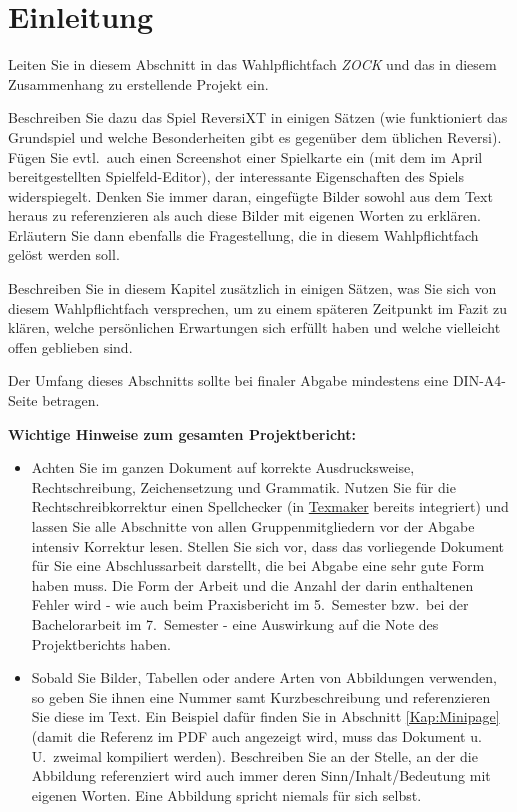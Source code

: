 \documentclass[12pt,a4paper,bibliography=totocnumbered,listof=totocnumbered]{article}
\begin{document}
\section{Einleitung}
Leiten Sie in diesem Abschnitt in das Wahlpflichtfach \emph{ZOCK} und das in diesem Zusammenhang zu erstellende Projekt ein.

Beschreiben Sie dazu das Spiel ReversiXT in einigen Sätzen (wie funktioniert das Grundspiel und welche Besonderheiten gibt es gegenüber dem üblichen Reversi). Fügen Sie evtl.\ auch einen Screenshot einer Spielkarte ein (mit dem im April bereitgestellten Spielfeld-Editor), der interessante Eigenschaften des Spiels widerspiegelt. Denken Sie immer daran, eingefügte Bilder sowohl aus dem Text heraus zu referenzieren als auch diese Bilder mit eigenen Worten zu erklären. Erläutern Sie dann ebenfalls die Fragestellung, die in diesem Wahlpflichtfach gelöst werden soll.

Beschreiben Sie in diesem Kapitel zusätzlich in einigen Sätzen, was Sie sich von diesem Wahlpflichtfach versprechen, um zu einem späteren Zeitpunkt im Fazit zu klären, welche persönlichen Erwartungen sich erfüllt haben und welche vielleicht offen geblieben sind.

Der Umfang dieses Abschnitts sollte bei finaler Abgabe mindestens eine DIN-A4-Seite betragen.

\bigskip

\textbf{Wichtige Hinweise zum gesamten Projektbericht:}
\begin{itemize}
  \item Achten Sie im ganzen Dokument auf korrekte Ausdrucksweise, Rechtschreibung, Zeichensetzung und Grammatik. Nutzen Sie für die Rechtschreibkorrektur einen Spellchecker (in \href{http://www.xm1math.net/texmaker/}{Texmaker} bereits integriert) und lassen Sie alle Abschnitte von allen Gruppenmitgliedern vor der Abgabe intensiv Korrektur lesen. Stellen Sie sich vor, dass das vorliegende Dokument für Sie eine Abschlussarbeit darstellt, die bei Abgabe eine sehr gute Form haben muss. Die Form der Arbeit und die Anzahl der darin enthaltenen Fehler wird - wie auch beim Praxisbericht im 5.\ Semester bzw.\ bei der Bachelorarbeit im 7.\ Semester - eine Auswirkung auf die Note des Projektberichts haben.
  \item Sobald Sie Bilder, Tabellen oder andere Arten von Abbildungen verwenden, so geben Sie ihnen eine Nummer samt Kurzbeschreibung und referenzieren Sie diese im Text. Ein Beispiel dafür finden Sie in Abschnitt \ref{Kap:Minipage} (damit die Referenz im PDF auch angezeigt wird, muss das Dokument u.\,U.\ zweimal kompiliert werden). Beschreiben Sie an der Stelle, an der die Abbildung referenziert wird auch immer deren Sinn/Inhalt/Bedeutung mit eigenen Worten. Eine Abbildung spricht niemals für sich selbst.
\end{itemize}
\end{document}
